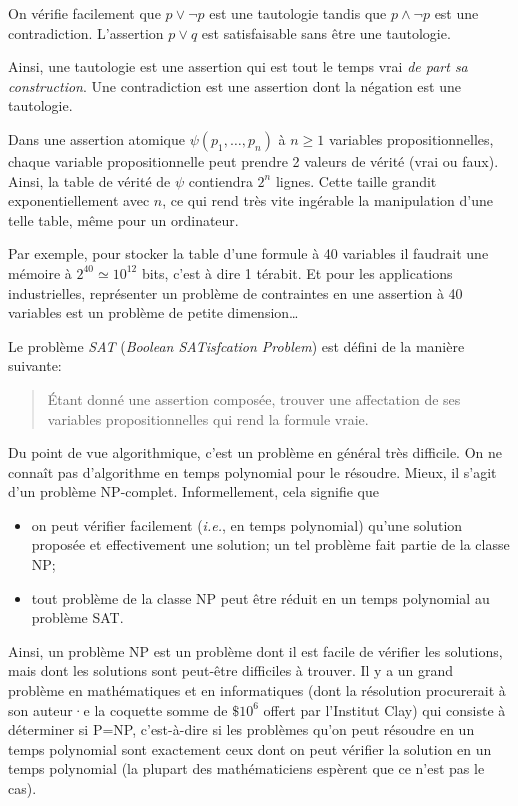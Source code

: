 \documentclass[french,course,oneside,theoremnosection]{lecture}
\newenvironment{further}[1]
{\begin{tcolorbox}[colframe=gray!50, colback=gray!5, arc=0pt, outer arc=0pt, boxrule=0.5pt, title=#1, breakable]}
{\end{tcolorbox}}
\begin{document}
\begin{example}
On vérifie facilement que $p \vee \neg p$ est une tautologie tandis que $p \wedge \neg p$ est une contradiction. L'assertion $p \vee q$ est satisfaisable sans être une tautologie.
\end{example}

Ainsi, une tautologie est une assertion qui est tout le temps vrai \emph{de part sa construction}. Une contradiction est une assertion dont la négation est une tautologie.

\begin{further}{SAT~-~Problème de satisfaisabilité booléenne}
Dans une assertion atomique $\psi(p_1, \ldots, p_n)$ à $n\geq 1$ variables propositionnelles, chaque variable propositionnelle peut prendre 2 valeurs de vérité (vrai ou faux). Ainsi, la table de vérité de $\psi$ contiendra $2^n$ lignes. Cette taille grandit exponentiellement avec $n$, ce qui rend très vite ingérable la manipulation d'une telle table, même pour un ordinateur.

Par exemple, pour stocker la table d'une formule à 40 variables il faudrait une mémoire à  $2^{40}\simeq 10^{12}$ bits, c'est à dire 1 térabit. Et pour les applications industrielles, représenter un problème de contraintes en une assertion à 40 variables est un problème de petite dimension\ldots

Le problème \emph{SAT} (\emph{Boolean SATisfcation Problem}) est défini de la manière suivante:
\begin{quotation}
Étant donné une assertion composée, trouver une affectation de ses variables propositionnelles qui rend la formule vraie.
\end{quotation}
Du point de vue algorithmique, c'est un problème en général très difficile. On ne connaît pas d'algorithme en temps polynomial pour le résoudre. Mieux, il s'agit d'un problème NP-complet. Informellement, cela signifie que
\begin{itemize}
\item on peut vérifier facilement (\emph{i.e.}, en temps polynomial) qu'une solution proposée et effectivement une solution; un tel problème fait partie de la classe NP;
\item tout problème de la classe NP peut être réduit en un temps polynomial au problème SAT.
\end{itemize}

Ainsi, un problème NP est un problème dont il est facile de vérifier les solutions, mais dont les solutions sont peut-être difficiles à trouver. Il y a un grand problème en mathématiques et en informatiques (dont la résolution procurerait à son auteur·e la coquette somme de $\$10^6$ offert par l'Institut Clay) qui consiste à déterminer si P=NP, c'est-à-dire si les problèmes qu'on peut résoudre en un temps polynomial sont exactement ceux dont on peut vérifier la solution en un temps polynomial (la plupart des mathématiciens espèrent que ce n'est pas le cas).
\end{further}
\end{document}
